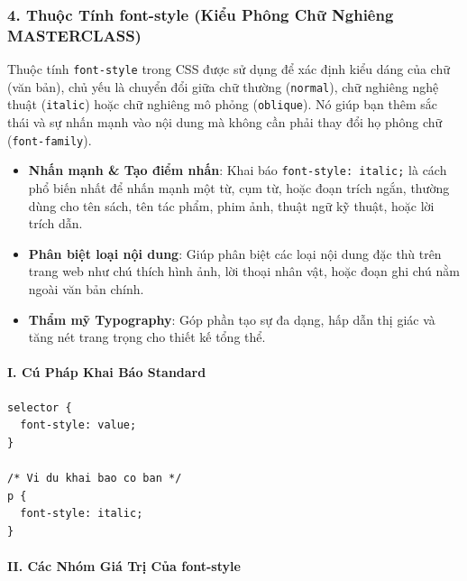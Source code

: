 \documentclass[11pt,oneside]{book}
\newcommand{\codeinline}[1]{\textcolor{accentOrange}{\texttt{#1}}}
\begin{document}
\subsubsection{4. Thuộc Tính font-style (Kiểu Phông Chữ Nghiêng MASTERCLASS)}
\label{sec:font_style}

Thuộc tính \codeinline{font-style} trong CSS được sử dụng để xác định kiểu dáng của chữ (văn bản), chủ yếu là chuyển đổi giữa chữ thường (\codeinline{normal}), chữ nghiêng nghệ thuật (\codeinline{italic}) hoặc chữ nghiêng mô phỏng (\codeinline{oblique}). Nó giúp bạn thêm sắc thái và sự nhấn mạnh vào nội dung mà không cần phải thay đổi họ phông chữ (\codeinline{font-family}).

\begin{conceptBox}
\begin{itemize}[leftmargin=1.5em, itemsep=4pt, parsep=0pt]
    \item \textbf{Nhấn mạnh \& Tạo điểm nhấn}: Khai báo \codeinline{font-style: italic;} là cách phổ biến nhất để nhấn mạnh một từ, cụm từ, hoặc đoạn trích ngắn, thường dùng cho tên sách, tên tác phẩm, phim ảnh, thuật ngữ kỹ thuật, hoặc lời trích dẫn.
    \item \textbf{Phân biệt loại nội dung}: Giúp phân biệt các loại nội dung đặc thù trên trang web như chú thích hình ảnh, lời thoại nhân vật, hoặc đoạn ghi chú nằm ngoài văn bản chính.
    \item \textbf{Thẩm mỹ Typography}: Góp phần tạo sự đa dạng, hấp dẫn thị giác và tăng nét trang trọng cho thiết kế tổng thể.
\end{itemize}
\end{conceptBox}

\paragraph*{I. Cú Pháp Khai Báo Standard}
\begin{codeWindow}
\begin{lstlisting}[language=CSS3]
selector {
  font-style: value;
}

/* Vi du khai bao co ban */
p {
  font-style: italic;
}
\end{lstlisting}
\end{codeWindow}

\paragraph*{II. Các Nhóm Giá Trị Của font-style}
\end{document}
